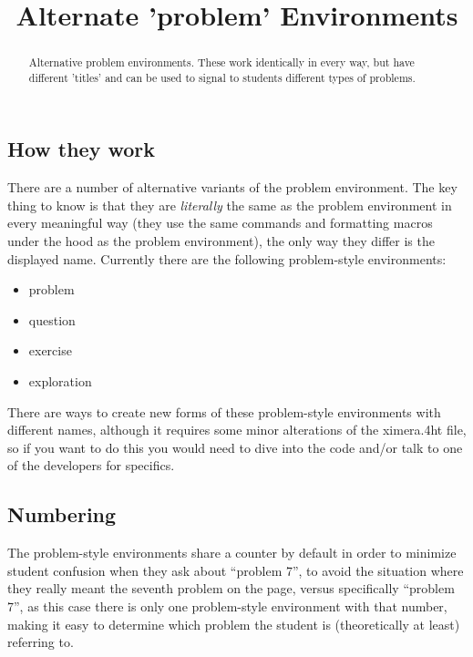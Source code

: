 \documentclass{ximera}
\title{Alternate 'problem' Environments}
\begin{document}
\begin{abstract}
    Alternative problem environments. These work identically in every way, but have different 'titles' and can be used to signal to students different types of problems.
\end{abstract}
\maketitle

    \subsection*{How they work}
        
        There are a number of alternative variants of the problem environment. The key thing to know is that they are \textit{literally} the same as the problem environment in every meaningful way (they use the same commands and formatting macros under the hood as the problem environment), the only way they differ is the displayed name. Currently there are the following problem-style environments:
        
        \begin{itemize}
            \item problem
            \item question
            \item exercise
            \item exploration
        \end{itemize}
        
        There are ways to create new forms of these problem-style environments with different names, although it requires some minor alterations of the ximera.4ht file, so if you want to do this you would need to dive into the code and/or talk to one of the developers for specifics.
    
    \subsection*{Numbering}
    
        The problem-style environments share a counter by default in order to minimize student confusion when they ask about ``problem 7'', to avoid the situation where they really meant the seventh problem on the page, versus specifically ``problem 7'', as this case there is only one problem-style environment with that number, making it easy to determine which problem the student is (theoretically at least) referring to.
    
\end{document}
